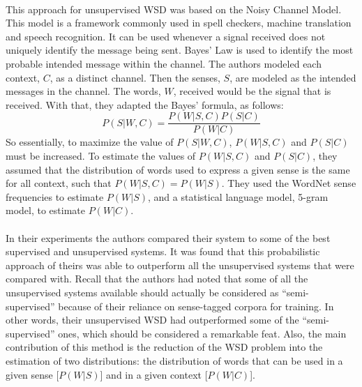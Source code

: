 \documentclass[12 pt]{article}
\begin{document}
\paragraph{}
This approach for unsupervised WSD was based on the Noisy Channel Model. This model is a framework commonly used in spell checkers, machine translation and speech recognition. It can be used whenever a signal received does not uniquely identify the message being sent. Bayes' Law is used to identify the most probable intended message within the channel. The authors modeled each context, $C$, as a distinct channel. Then the senses, $S$, are modeled as the intended messages in the channel. The words, $W$, received would be the signal that is received. With that, they adapted the Bayes' formula, as follows:
\begin{equation}
\label{bayes}
P(S|W,C) = \frac{P(W|S,C)P(S|C)}{P(W|C)}
\end{equation}
So essentially, to maximize the value of $P(S|W,C)$, $P(W|S,C)$ and $P(S|C)$ must be increased. To estimate the values of $P(W|S,C)$ and $P(S|C)$, they assumed that the distribution of words used to express a given sense is the same for all context, such that $P(W|S,C) = P(W|S)$. They used the WordNet sense frequencies to estimate $P(W|S)$, and a statistical language model, 5-gram model, to estimate $P(W|C)$.

\paragraph{}
In their experiments the authors compared their system to some of the best supervised and unsupervised systems. It was found that this probabilistic approach of theirs was able to outperform all the unsupervised systems that were compared with. Recall that the authors had noted that some of all the unsupervised systems available should actually be considered as ``semi-supervised'' because of their reliance on sense-tagged corpora for training. In other words, their unsupervised WSD had outperformed some of the ``semi-supervised'' ones, which should be considered a remarkable feat. Also, the main contribution of this method is the reduction of the WSD problem into the estimation of two distributions: the distribution of words that can be used in a given sense [$P(W|S)$] and in a given context [$P(W|C)$].
\end{document}
